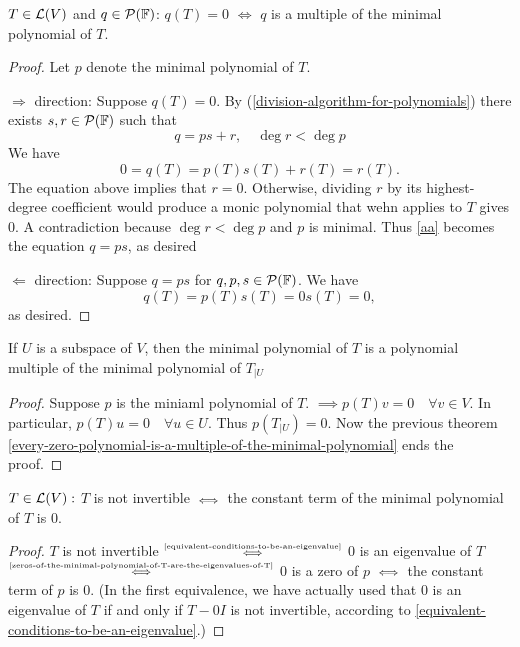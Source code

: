 \setcounter{thm}{28}
\begin{thm}
    \label{every-zero-polynomial-is-a-multiple-of-the-minimal-polynomial}
    $T\in \mathcal{L}(V)$ and $q \in \mathcal{P} (\mathbb{F})$: $q(T)=0$ $\iff$ $q$ is a multiple of the minimal polynomial of $T$.
\end{thm}
\begin{proof}
    Let $p$ denote the minimal polynomial of $T$.

    $\Rightarrow$ direction: Suppose $q(T)=0$.
    By (\ref{division-algorithm-for-polynomials}) there exists $s,r \in \mathcal{P} (\mathbb{F})$ such that
    \begin{equation}
        q=ps+r, \quad \deg r < \deg p
    \end{equation}
    We have
    \begin{equation}
        \label{aa}
        0 = q(T) = p(T)s(T) + r(T) = r(T).
    \end{equation}
    The equation above implies that $r=0$. Otherwise, dividing $r$ by its highest-degree coefficient would produce a monic polynomial that wehn applies to $T$ gives $0$. A contradiction because $\deg r < \deg p$ and $p$ is minimal. Thus \ref{aa} becomes the equation $q=ps$, as desired

    $\Leftarrow$ direction: Suppose $q=ps$ for $q,p,s \in \mathcal{P}(\mathbb{F})$. We have
    \begin{equation}
        q(T) = p(T)s(T)=0s(T)=0,
    \end{equation}
    as desired.
\end{proof}

\setcounter{thm}{30}
\begin{thm}
    \label{minimal-polynomial-of-a-restriction-operator}
    If $U$ is a subspace of $V$, then the minimal polynomial of $T$ is a polynomial multiple of the minimal polynomial of $T_{|U}$
\end{thm}
\begin{proof}
    Suppose $p$ is the miniaml polynomial of $T$. $\implies p(T)v=0 \quad \forall v \in V$. In particular, $p(T)u=0 \quad \forall u\in U$. Thus $p(T_{|U})=0.$ Now the previous theorem
    \ref{every-zero-polynomial-is-a-multiple-of-the-minimal-polynomial} ends the proof.
\end{proof}

\begin{thm}
    $T \in \mathcal{L} (V):$ $T$ is not invertible $\mathsmaller{\iff}$ the constant term of the minimal polynomial of $T$ is $0$.
\end{thm}
\begin{proof}
    $T$ is not invertible $\mathsmaller{\overset{\text{\ref{equivalent-conditions-to-be-an-eigenvalue}}}{\iff}}$ $0$ is an eigenvalue of $T$ $\mathsmaller{\overset{\text{\ref{zeros-of-the-minimal-polynomial-of-T-are-the-eigenvalues-of-T}}}{\iff}}$ $0$ is a zero of $p$ $\mathsmaller{\iff}$ the constant term of $p$ is $0$.
    (In the first equivalence, we have actually used that $0$ is an eigenvalue of $T$ if and only if $T-0I$ is not invertible, according to \ref{equivalent-conditions-to-be-an-eigenvalue}.)
\end{proof}

